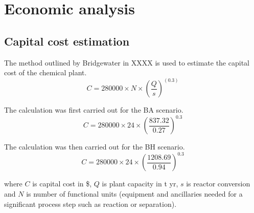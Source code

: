 
\section{Economic analysis}
\label{app:economics}
\subsection{Capital cost estimation}

The method outlined by Bridgewater in XXXX is used to estimate the capital cost of the chemical plant.
\begin{equation}
    C=280000 \times N \times (\frac{Q}{s})^(0.3)
\end{equation}

The calculation was first carried out for the BA scenario.
\begin{equation}
    C=280000 \times 24 \times (\frac{837.32}{0.27})^0.3
\end{equation}
    
The calculation was then carried out for the BH scenario.
\begin{equation}
    C=280000 \times 24 \times (\frac{1208.69}{0.94} )^0.3
\end{equation}

where $C$ is capital cost in \$, $Q$ is  plant capacity in t yr, $s$ is reactor conversion and $N$ is number of functional units (equipment and ancillaries needed for a significant process step such as reaction or separation).